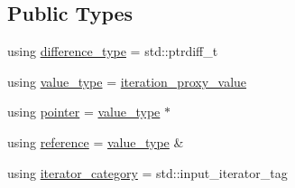 \subsection*{Public Types}
\begin{DoxyCompactItemize}
\item 
using \hyperlink{classnlohmann_1_1detail_1_1iteration__proxy__value_ada6b4e6d55d8ed7ac79e49a03e9d1fe2}{difference\+\_\+type} = std\+::ptrdiff\+\_\+t
\item 
using \hyperlink{classnlohmann_1_1detail_1_1iteration__proxy__value_a5e90a5810cc1bb6c1000eabbfdfe7b9e}{value\+\_\+type} = \hyperlink{classnlohmann_1_1detail_1_1iteration__proxy__value}{iteration\+\_\+proxy\+\_\+value}
\item 
using \hyperlink{classnlohmann_1_1detail_1_1iteration__proxy__value_a44c64feee85b8e7164a05310e6418a4b}{pointer} = \hyperlink{classnlohmann_1_1detail_1_1iteration__proxy__value_a5e90a5810cc1bb6c1000eabbfdfe7b9e}{value\+\_\+type} $\ast$
\item 
using \hyperlink{classnlohmann_1_1detail_1_1iteration__proxy__value_a5bc7d3133daab5ec4797f3132e093af8}{reference} = \hyperlink{classnlohmann_1_1detail_1_1iteration__proxy__value_a5e90a5810cc1bb6c1000eabbfdfe7b9e}{value\+\_\+type} \&
\item 
using \hyperlink{classnlohmann_1_1detail_1_1iteration__proxy__value_a1ab8c44e3772c03651b5ad07216043cf}{iterator\+\_\+category} = std\+::input\+\_\+iterator\+\_\+tag
\end{DoxyCompactItemize}
